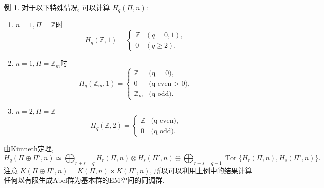 \documentclass{ctexart}
\theoremstyle{plain}
\theoremstyle{definition}
\newtheorem{example}[theorem]{例}
\begin{document}
        \begin{example}
            对于以下特殊情况, 可以计算 $H_{q}(\Pi,n)$:
            \begin{enumerate}
                \item $n=1, \Pi=\mathbb{Z}$时 
                    \begin{equation*}
                        H_{q}(\mathbb{Z},1)=\begin{cases} \mathbb{Z} & (q=0,1), \\ 0 & (q\ge 2). \end{cases}
                    \end{equation*}
                \item $n=1, \Pi=\mathbb{Z}_{m}$时
                    \begin{equation*}
                        H_q(\mathbb{Z}_m, 1) = 
                        \begin{cases} 
                        \mathbb{Z} & \text{(q = 0)}, \\
                        0 & \text{(q even > 0)}, \\
                        \mathbb{Z}_m & \text{(q odd)}.
                        \end{cases}
                    \end{equation*}
                \item $n=2, \Pi=\mathbb{Z}$
                \begin{equation*}
                    H_q(\mathbb{Z}, 2) = 
                    \begin{cases} 
                    \mathbb{Z} & \text{(q even)}, \\
                    0 & \text{(q odd)}.
                    \end{cases}
                \end{equation*}                    
            \end{enumerate}
        \end{example}

        由Künneth定理,
        \begin{equation*}
            H_q(\Pi \oplus \Pi', n) \simeq \bigoplus_{r+s=q} H_r(\Pi, n) \otimes H_s(\Pi', n) \oplus
            \bigoplus_{r+s=q-1} \operatorname{Tor}\{H_r(\Pi, n), H_s(\Pi', n)\}.
        \end{equation*}
        注意 $K(\Pi\oplus \Pi',n)=K(\Pi,n)\times K(\Pi',n)$, 所以可以利用上例中的结果计算任何以有限生成Abel群为基本群的EM空间的同调群.
\end{document}
